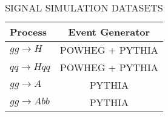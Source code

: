 \begin{table}[tpb]
  \begin{center}
    \caption{SIGNAL SIMULATION DATASETS}
    \label{tab:signalsimulations}
    \begin{tabular}{lc}
      \toprule
      Process & Event Generator \\
      \midrule
      $gg \rightarrow H$ & POWHEG + PYTHIA \\
      $qq \rightarrow Hqq$ & POWHEG + PYTHIA \\
      $gg \rightarrow A$ & PYTHIA \\
      $gg \rightarrow Abb$ & PYTHIA \\
      \bottomrule
    \end{tabular}
  \end{center}
\end{table}

